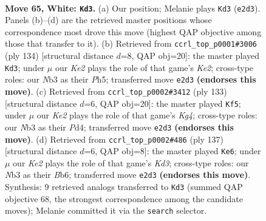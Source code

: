 \documentclass[11pt]{article}
\begin{document}
\clearpage

\begin{figure}[p]\centering
\begin{subfigure}{0.46\textwidth}\centering
\resizebox{\linewidth}{!}{%
\newchessgame
\chessboard[
  setfen={6k1/2P5/2r5/8/8/1N4B1/4K3/8 w - - 43 65},
  showmover=false,
  pgfstyle=straightmove, color=movearrow, markmove={e2-d3}
]}
\caption{}
\end{subfigure}\hfill
\begin{subfigure}{0.46\textwidth}\centering
\resizebox{\linewidth}{!}{%
\newchessgame
\chessboard[
  setfen={8/1B6/2P5/2r4P/8/6k1/4K3/8 w - - 3 68},
  showmover=false,
  pgfstyle=straightmove, color=movearrow, markmove={e2-d3}
]}
\caption{}
\end{subfigure}
\\[4pt]
\begin{subfigure}{0.46\textwidth}\centering
\resizebox{\linewidth}{!}{%
\newchessgame
\chessboard[
  setfen={1b6/8/8/6k1/3p4/5K2/7p/7R b - - 7 67},
  showmover=false,
  pgfstyle=straightmove, color=movearrow, markmove={g5-f5}
]}
\caption{}
\end{subfigure}\hfill
\begin{subfigure}{0.46\textwidth}\centering
\resizebox{\linewidth}{!}{%
\newchessgame
\chessboard[
  setfen={b7/5R2/1b1k4/8/6K1/5p2/8/8 b - - 3 69},
  showmover=false,
  pgfstyle=straightmove, color=movearrow, markmove={d6-e6}
]}
\caption{}
\end{subfigure}
\caption{\textbf{Move 65, White: \texttt{Kd3}.} (a) Our position; Melanie plays \texttt{Kd3} (\texttt{e2d3}). Panels (b)--(d) are the retrieved master positions whose correspondence most drove this move (highest QAP objective among those that transfer to it). (b) Retrieved from \texttt{ccrl\_top\_p0001\#3006} (ply 134) [structural distance $d$=8, QAP obj=20]: the master played \texttt{Kd3}; under $\mu$ our \emph{Ke2} plays the role of that game's \emph{Ke2}; cross-type roles: our \emph{N}b3 as their \emph{P}h5; transferred move \texttt{e2d3} \textbf{(endorses this move)}. (c) Retrieved from \texttt{ccrl\_top\_p0002\#3412} (ply 133) [structural distance $d$=6, QAP obj=20]: the master played \texttt{Kf5}; under $\mu$ our \emph{Ke2} plays the role of that game's \emph{Kg4}; cross-type roles: our \emph{N}b3 as their \emph{P}d4; transferred move \texttt{e2d3} \textbf{(endorses this move)}. (d) Retrieved from \texttt{ccrl\_top\_p0002\#486} (ply 137) [structural distance $d$=6, QAP obj=8]: the master played \texttt{Ke6}; under $\mu$ our \emph{Ke2} plays the role of that game's \emph{Kd3}; cross-type roles: our \emph{N}b3 as their \emph{B}b6; transferred move \texttt{e2d3} \textbf{(endorses this move)}. Synthesis: 9 retrieved analogs transferred to \texttt{Kd3} (summed QAP objective 68, the strongest correspondence among the candidate moves); Melanie committed it via the \texttt{search} selector.}
\label{fig:thought-m128}
\end{figure}
\end{document}
